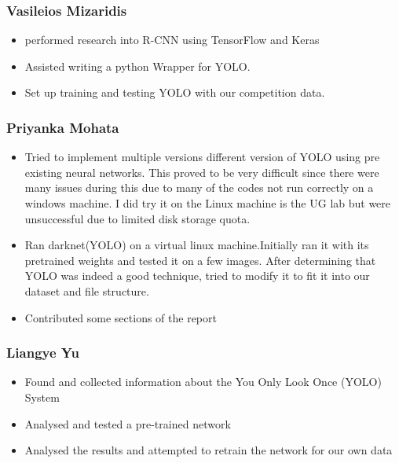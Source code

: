 \documentclass[11pt]{article}
\providecommand{\tightlist}{%
      \setlength{\itemsep}{0pt}\setlength{\parskip}{0pt}}
\begin{document}
\subsubsection*{Vasileios Mizaridis}\label{vasileios-mizaridis}

\begin{itemize}
\item
  performed research into R-CNN using TensorFlow and Keras
\item
  Assisted writing a python Wrapper for YOLO.
\item
  Set up training and testing YOLO with our competition data.
\end{itemize}

\subsubsection*{Priyanka Mohata}\label{priyanka-mohata}

\begin{itemize}
\item
  Tried to implement multiple versions different version of YOLO using
  pre existing neural networks. This proved to be very difficult since
  there were many issues during this due to many of the codes not run
  correctly on a windows machine. I did try it on the Linux machine is
  the UG lab but were unsuccessful due to limited disk storage quota.
\item
  Ran darknet(YOLO) on a virtual linux machine.Initially ran it with its
  pretrained weights and tested it on a few images. After determining
  that YOLO was indeed a good technique, tried to modify it to fit it
  into our dataset and file structure.
\item
  Contributed some sections of the report
\end{itemize}

\subsubsection*{Liangye Yu}\label{liangye-yu}

\begin{itemize}
\tightlist
\item
  Found and collected information about the You Only Look Once (YOLO)
  System
\item
  Analysed and tested a pre-trained network
\item
  Analysed the results and attempted to retrain the network for our own
  data
\end{itemize}
\end{document}
